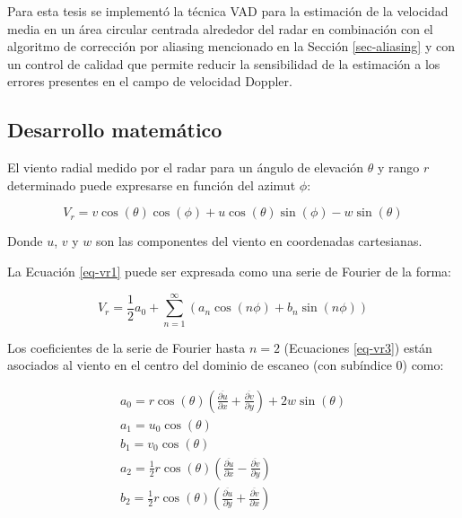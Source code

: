 \documentclass[12pt,spanish,oneside, a4paper]{book}
\begin{document}
Para esta tesis se implementó la técnica VAD para la estimación de la
velocidad media en un área circular centrada alrededor del radar en
combinación con el algoritmo de corrección por aliasing mencionado en la
Sección \ref{sec-aliasing} y con un control de calidad que permite
reducir la sensibilidad de la estimación a los errores presentes en el
campo de velocidad Doppler.

\subsection{Desarrollo matemático}\label{desarrollo-matematico}

El viento radial medido por el radar para un ángulo de elevación
\(\theta\) y rango \(r\) determinado puede expresarse en función del
azimut \(\phi\):

\begin{equation}
\label{eq-vr1}
V_r =  v \cos(\theta) \cos(\phi) + u \cos(\theta) \sin(\phi) - w \sin(\theta)
\end{equation}

Donde \(u\), \(v\) y \(w\) son las componentes del viento en coordenadas
cartesianas.

La Ecuación \ref{eq-vr1} puede ser expresada como una serie de Fourier
de la forma:

\begin{equation}
\label{eq-vr2}
V_r =  \frac{1}{2}a_0 + \sum_{n = 1}^{\infty} (a_n \cos(n\phi) + b_n \sin(n \phi)) 
\end{equation}

Los coeficientes de la serie de Fourier hasta \(n=2\) (Ecuaciones
\ref{eq-vr3}) están asociados al viento en el centro del dominio de
escaneo (con subíndice 0) como:

\begin{equation} \label{eq-vr3}
\begin{aligned}
a_0 = r \cos(\theta)\left ( \frac{\overline{\partial u}}{\partial x} + \frac{\overline{\partial v}}{\partial y} \right) + 2 w \sin(\theta) \\
a_1 = u_0 \cos(\theta) \\
b_1 = v_0 \cos(\theta) \\
a_2 = \frac{1}{2} r \cos(\theta)\left ( \frac{\overline{\partial u}}{\partial x} - \frac{\overline{\partial v}}{\partial y} \right) \\
b_2 = \frac{1}{2} r \cos(\theta)\left ( \frac{\overline{\partial u}}{\partial y} + \frac{\overline{\partial v}}{\partial x} \right)
\end{aligned}
\end{equation}
\end{document}
